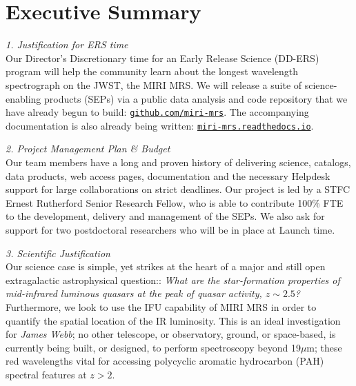 
\section*{{\sc Executive Summary}}
\noindent
{\it 1. Justification for ERS time}\\
Our Director’s Discretionary time for an Early Release Science (DD-ERS) 
program will help the community learn about the longest 
wavelength spectrograph on the JWST, the MIRI MRS. 
We will release a suite of science-enabling products (SEPs)
via a public data analysis and code repository that we have already 
begun to build: 
\href{https://github.com/miri-mrs}{\tt github.com/miri-mrs}. 
The accompanying documentation is also already being written:
\href{http://miri-mrs.readthedocs.io/}{{\tt miri-mrs.readthedocs.io}}. 

\smallskip \smallskip
\noindent
{\it 2. Project Management Plan \& Budget} \\
Our team members have a long and proven history of delivering science,
catalogs, data products, web access pages, documentation and the
necessary Helpdesk support for large collaborations on strict
deadlines.  Our project is led by a STFC Ernest Rutherford Senior
Research Fellow, who is able to contribute 100\% FTE to the
development, delivery and management of the SEPs.  We also ask for
support for two postdoctoral researchers who will be in place at
Launch time.

\smallskip \smallskip
\noindent
{\it 3. Scientific Justification}\\
Our science case is simple, yet strikes at the heart of a major and
still open extragalactic astrophysical question:: {\it What are the
star-formation properties of mid-infrared luminous quasars at the peak
of quasar activity, $z\sim2.5$? } Furthermore, we look to use the IFU
capability of MIRI MRS in order to quantify the spatial location of
the IR luminosity.  This is an ideal investigation for {\it James
Webb}; no other telescope, or observatory, ground, or space-based, is
currently being built, or designed, to perform spectroscopy beyond
19$\mu$m; these red wavelengths vital for accessing polycyclic
aromatic hydrocarbon (PAH) spectral features at $z>2$.

